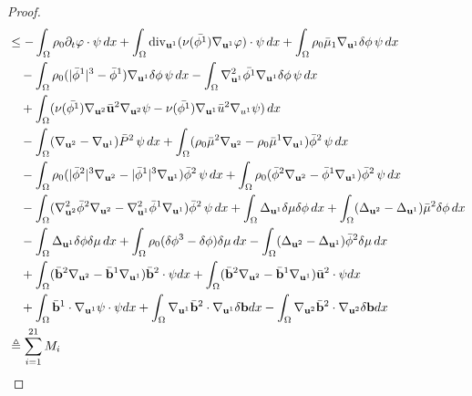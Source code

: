 \documentclass[11pt]{article}
\newcommand{\Dv}{{\rm div}}
\numberwithin{equation}{section}
\begin{document}
\begin{proof}
\begin{equation}
\begin{split}
&\leq -\int_\Omega \rho_0 \partial_t \varphi \cdot \psi \, dx + \int_\Omega \Dv_{\mathbf{u}^1} (\nu(\bar{\phi^1}) \nabla_{\mathbf{u}^1} \varphi) \cdot \psi \, dx + \int_\Omega \rho_0 \bar{\mu}_1 \nabla_{\mathbf{u}^1} \delta\phi \, \psi \, dx \\
&\quad-\int_\Omega \rho_0 (|\bar{\phi}^1|^3 - \bar{\phi}^1) \nabla_{\mathbf{u}^1} \delta\phi \, \psi \, dx - \int_\Omega\nabla^2_{\mathbf{u}^1} \bar{\phi^1} \nabla_{\mathbf{u}^1} \delta\phi\, \psi \, dx\\
&\quad+ \int_\Omega (\nu(\bar{\phi^1}) \nabla_{\mathbf{u}^2} \bar{\mathbf{u}}^2 \nabla_{\mathbf{u}^2}\psi - \nu(\bar{\phi^1}) \nabla_{\mathbf{u}^1} \bar{u}^2 \nabla_{u^1}\psi) \, dx \\
&\quad-\int_\Omega (\nabla_{\mathbf{u}^2} - \nabla_{\mathbf{u}^1}) \bar{P}^2 \, \psi \, dx + \int_\Omega (\rho_0 \bar{\mu}^2 \nabla_{\mathbf{u}^2} - \rho_0 \bar{\mu}^1 \nabla_{\mathbf{u}^1}) \bar{\phi}^2 \, \psi \, dx \\
&\quad-\int_\Omega \rho_0 (|\bar{\phi}^2|^3 \nabla_{\mathbf{u}^2} - |\bar{\phi}^1|^3 \nabla_{\mathbf{u}^1}) \bar{\phi}^2 \, \psi \, dx + \int_\Omega \rho_0 (\bar{\phi}^2 \nabla_{\mathbf{u}^2} - \bar{\phi}^1 \nabla_{\mathbf{u}^1}) \bar{\phi}^2 \, \psi \, dx \\
&\quad-\int_\Omega (\nabla_{\mathbf{u}^2}^2 \bar{\phi}^2 \nabla_{\mathbf{u}^2} - \nabla_{\mathbf{u}^1}^2 \bar{\phi}^1 \nabla_{\mathbf{u}^1}) \bar{\phi}^2 \, \psi \, dx + \int_\Omega \Delta_{\mathbf{u}^1} \delta\mu \delta\phi \, dx + \int_\Omega (\Delta_{\mathbf{u}^2} - \Delta_{\mathbf{u}^1}) \bar{\mu}^2 \delta\phi \, dx \\
&\quad-\int_\Omega \Delta_{\mathbf{u}^1} \delta\phi \delta \mu \, dx + \int_\Omega \rho_0 (\delta\phi^3 - \delta\phi) \delta \mu \, dx - \int_\Omega (\Delta_{\mathbf{u}^2} - \Delta_{\mathbf{u}^1}) \bar{\phi}^2 \delta \mu \, dx\\
&\quad+\int_\Omega (\bar{\mathbf{b}}^2\nabla_{\mathbf{u}^2}-\bar{\mathbf{b}}^1\nabla_{\mathbf{u}^1}) \bar{\mathbf{b}}^2\cdot \mathbf{\psi}dx +\int_\Omega (\bar{\mathbf{b}}^2\nabla_{\mathbf{u}^2}-\bar{\mathbf{b}}^1\nabla_{\mathbf{u}^1}) \bar{\mathbf{u}}^2\cdot \mathbf{\psi}dx\\
&\quad+\int_\Omega \bar{\mathbf{b}}^1\cdot\nabla_{\mathbf{u}^1}\mathbf{\psi}\cdot\mathbf{\psi}dx+
\int_\Omega\nabla_{\mathbf{u}^1}\bar{\mathbf{b}}^2\cdot\nabla_{\mathbf{u}^1} \delta\mathbf{b}dx-\int_\Omega\nabla_{\mathbf{u}^2}\bar{\mathbf{b}}^2
\cdot\nabla_{\mathbf{u}^2} \delta\mathbf{b}dx
\\&\triangleq\sum_{i = 1}^{21} M_i

\end{split}
\end{equation}
\end{proof}
\end{document}
